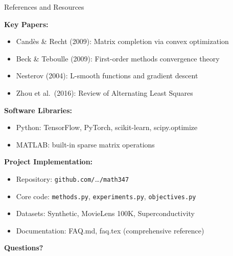 \documentclass[aspectratio=169,usenames,dvipsnames]{beamer}
\begin{document}
\begin{frame}{References and Resources}
    
    \textbf{Key Papers:}
    \begin{itemize}
        \item Candès \& Recht (2009): Matrix completion via convex optimization
        \item Beck \& Teboulle (2009): First-order methods convergence theory
        \item Nesterov (2004): L-smooth functions and gradient descent
        \item Zhou et al.\ (2016): Review of Alternating Least Squares
    \end{itemize}
    
    \vspace{0.3cm}
    
    \textbf{Software Libraries:}
    \begin{itemize}
        \item Python: TensorFlow, PyTorch, scikit-learn, scipy.optimize
        \item MATLAB: built-in sparse matrix operations
    \end{itemize}
    
    \vspace{0.3cm}
    
    \textbf{Project Implementation:}
    \begin{itemize}
        \item Repository: \texttt{github.com/}\ldots\texttt{/math347}
        \item Core code: \texttt{methods.py}, \texttt{experiments.py}, \texttt{objectives.py}
        \item Datasets: Synthetic, MovieLens 100K, Superconductivity
        \item Documentation: FAQ.md, faq.tex (comprehensive reference)
    \end{itemize}
    
    \vspace{0.5cm}
    
    \centering
    \Large \textcolor{emoryblue}{\textbf{Questions?}}
\end{frame}
\end{document}
